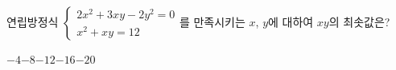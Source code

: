 연립방정식 $\begin{cases} 2x^2+3xy-2y^2=0 \\ x^2+xy=12 \end{cases}$를 만족시키는 $x$, $y$에 대하여 $xy$의 최솟값은?
\begin{choices32}{$-4$}{$-8$}{$-12$}{$-16$}{$-20$}\end{choices32}

